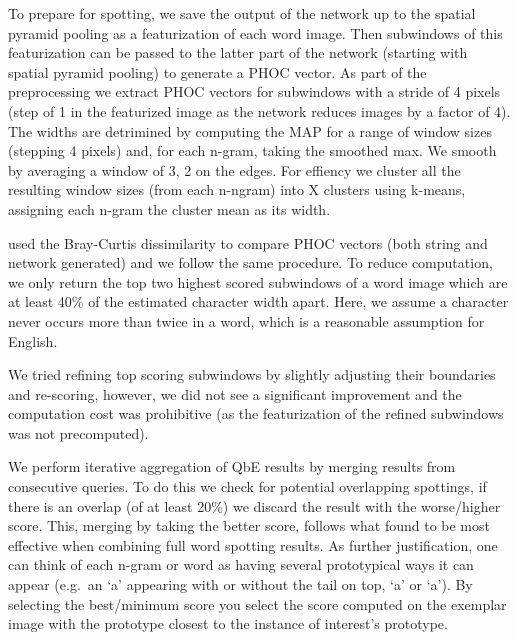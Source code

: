 \documentclass[ms,electronic,twosidetoc,letterpaper,chaptercenter,parttop,lol,lof,lot]{byumsphd}
\begin{document}
To prepare for spotting, we save the output of the network up to the spatial pyramid pooling as a featurization of each word image. Then subwindows of this featurization can be passed to the latter part of the network (starting with spatial pyramid pooling) to generate a PHOC vector. As part of the preprocessing we extract PHOC vectors for subwindows with a stride of 4 pixels (step of 1 in the featurized image as the network reduces images by a factor of 4).
The widths are detrimined by computing the MAP for a range of window sizes (stepping 4 pixels) and, for each n-gram, taking the smoothed max. We smooth by averaging a window of 3, 2 on the edges. For effiency we cluster all the resulting window sizes (from each n-ngram) into X clusters using k-means, assigning each n-gram the cluster mean as its width.

\cite{sudholt2016} used the Bray-Curtis dissimilarity to compare PHOC vectors (both string and network generated) and we follow the same procedure.
To reduce computation, we only return the top two highest scored subwindows of a word image which are at least 40\% of the estimated character width apart. Here, we assume a character never occurs more than twice in a word, which is a reasonable assumption for English.


We tried refining top scoring subwindows by slightly adjusting their boundaries and re-scoring, however, we did not see a significant improvement and the computation cost was prohibitive (as the featurization of the refined subwindows was not precomputed).

We perform iterative aggregation of QbE results by merging results from consecutive queries. To do this we check for potential overlapping spottings, if there is an overlap (of at least 20\%) we discard the result with the worse/higher score. This, merging by taking the better score, follows what \cite{Zagoris2015} found to be most effective when combining full word spotting results. As further justification, one can think of each n-gram or word as having several prototypical ways it can appear (e.g.~an `a' appearing with or without the tail on top, `\textsf{a}' or `{\selectfont\footnotesize a}'). By selecting the best/minimum score you select the score computed on the exemplar image with the prototype closest to the instance of interest's prototype.
\end{document}
